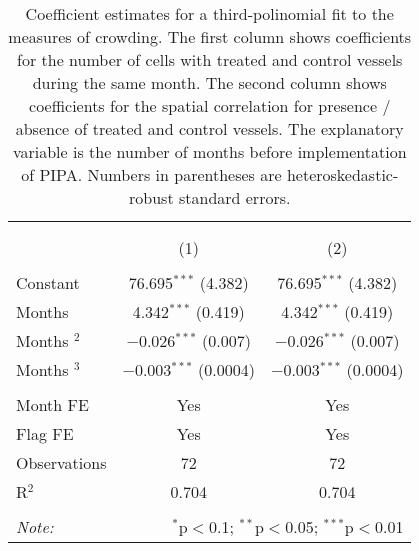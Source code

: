 
\begin{table}[!htbp] \centering 
  \caption{\label{tab:main_DID}Coefficient estimates for a third-polinomial fit to the measures of crowding. The first column shows coefficients for the number of cells with treated and control vessels during the same month. The second column shows coefficients for the spatial correlation for presence / absence of treated and control vessels. The explanatory variable is the number of months before implementation of PIPA. Numbers in parentheses are heteroskedastic-robust standard errors.} 
  \label{} 
\footnotesize 
\begin{tabular}{@{\extracolsep{1pt}}lcc} 
\\[-1.8ex]\hline 
\hline \\[-1.8ex] 
\\[-1.8ex] & (1) & (2)\\ 
\hline \\[-1.8ex] 
 Constant & 76.695$^{***}$ (4.382) & 76.695$^{***}$ (4.382) \\ 
  Months & 4.342$^{***}$ (0.419) & 4.342$^{***}$ (0.419) \\ 
  Months $^2$ & $-$0.026$^{***}$ (0.007) & $-$0.026$^{***}$ (0.007) \\ 
  Months $^3$ & $-$0.003$^{***}$ (0.0004) & $-$0.003$^{***}$ (0.0004) \\ 
 \hline \\[-1.8ex] 
Month FE & Yes & Yes \\ 
Flag FE & Yes & Yes \\ 
Observations & 72 & 72 \\ 
R$^{2}$ & 0.704 & 0.704 \\ 
\hline 
\hline \\[-1.8ex] 
\textit{Note:}  & \multicolumn{2}{r}{$^{*}$p$<$0.1; $^{**}$p$<$0.05; $^{***}$p$<$0.01} \\ 
\end{tabular} 
\end{table} 
